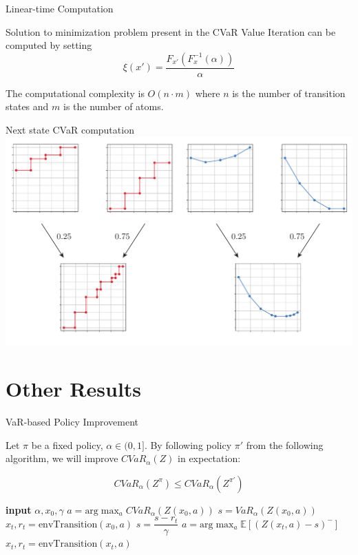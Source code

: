 \documentclass{beamer}
\begin{document}
\begin{frame}{Linear-time Computation}

\begin{theorem}
Solution to minimization problem present in the CVaR Value Iteration can be computed by setting
$$\xi ( x' ) = \dfrac{F_{x'}(F^{-1}_x(\alpha))}{\alpha} $$

The computational complexity is $O(n\cdot m)$ where $n$ is the number of transition states and $m$ is the number of atoms.
\end{theorem}
\end{frame}

\begin{frame}{Next state CVaR computation}
\center
\includegraphics[width=\linewidth]{../gfx/multivarvar.pdf}
\end{frame}

\section{Other Results}

\begin{frame}{VaR-based Policy Improvement}
\begin{theorem}
Let $\pi$ be a fixed policy, $\alpha \in (0, 1]$. By following policy $\pi'$ from the following algorithm, we will improve $CVaR_\alpha(Z)$ in expectation:

$$CVaR_\alpha(Z^\pi) \le CVaR_\alpha(Z^{\pi'})$$
\end{theorem}


\begin{algorithmic}
    \STATE \textbf{input} $\alpha, x_0, \gamma$
    \STATE $a = \text{arg}\max_a CVaR_\alpha(Z(x_0, a))$
    \STATE $s = VaR_\alpha(Z(x_0, a))$
    \STATE $x_t, r_t = \text{envTransition}(x_0, a)$
    	\STATE $s = \dfrac{s-r_t}{\gamma}$
    	\STATE $a = \text{arg}\max_a \mathbb{E}\left[(Z(x_t, a)-s)^- \right]$
    	\STATE $x_t, r_t = \text{envTransition}(x_t, a)$
   	\ENDWHILE
\end{algorithmic}

\end{frame}
\end{document}

